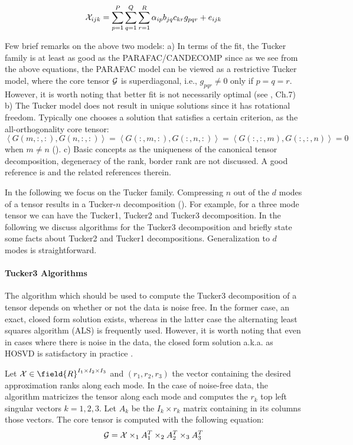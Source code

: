 \begin{equation}
{\cal X}_{ijk} = \sum_{p=1}^P \sum_{q=1}^Q \sum_{r=1}^R \alpha_{ip} b_{jq} c_{kr} g_{pqr} + e_{ijk}
\label{eq:tucker}
\end{equation}

Few brief remarks on the above two models: 
a) In terms of the fit, the Tucker family is at least as good as the PARAFAC/CANDECOMP
since as we see from the above equations, the PARAFAC model can be viewed as a restrictive Tucker model, where the core tensor ${\cal G}$ 
is superdiagonal, i.e., $g_{pqr} \neq 0$ only if $p=q=r$. 
However, it is worth noting that better fit is not necessarily optimal (see \cite{brobook}, Ch.7)
b) The Tucker model does not result in unique solutions since it has rotational freedom. 
Typically one chooses a solution that satisfies a certain criterion, as the all-orthogonality
core tensor: $\left\langle G(m,:,:),G(n,:,:) \right\rangle = \left\langle G(:,m,:),G(:,n,:) \right\rangle= \left\langle G(:,:,m),G(:,:,n) \right\rangle=0$ when $m\neq n$ (\cite{citeulike:4308452}). 
c) Basic concepts as the uniqueness of the canonical tensor decomposition, degeneracy of the rank, border rank are not discussed. A good reference is \cite{tamarasurvey}
and the related references therein. 

In the following we focus on the Tucker family.
Compressing $n$ out of the $d$ modes of a tensor results in a Tucker-$n$ decomposition (\cite{kiers2000}). 
For example, for a three mode tensor we can have the Tucker1, Tucker2 and Tucker3 decomposition. 
In the following we discuss algorithms for the Tucker3 decomposition and briefly state some facts about Tucker2 and Tucker1
decompositions. Generalization to $d$ modes is straightforward. 

\paragraph{Tucker3 Algorithms} 

The algorithm which should be used to compute the Tucker3 decomposition of a tensor 
depends on whether or not the data is noise free. In the former case, an exact, closed
form solution exists, whereas in the latter case the alternating least squares algorithm (ALS)
is frequently used. However, it is worth noting that even in cases where there is noise in the data, 
the closed form solution a.k.a. as HOSVD \cite{tamarasurvey,citeulike:4308452} is satisfactory in practice \cite{luo-2009}. 

Let ${\cal X} \in \field{R}^{I_1 \times I_2 \times I_3}$ and $(r_1,r_2,r_3)$ the vector containing 
the desired approximation ranks along each mode. 
In the case of noise-free data, the algorithm matricizes the tensor along each mode
and computes the $r_k$ top left singular vectors $k=1,2,3$. Let $A_k$ be the $I_k \times r_k$ matrix
containing in its columns those vectors. The core tensor is computed with the following equation:
\begin{equation}
{\cal G} = {\cal X} \times_1 A_1^T \times_2 A_2^T \times_3 A_3^T
\label{eq:eqcore}
\end{equation}


